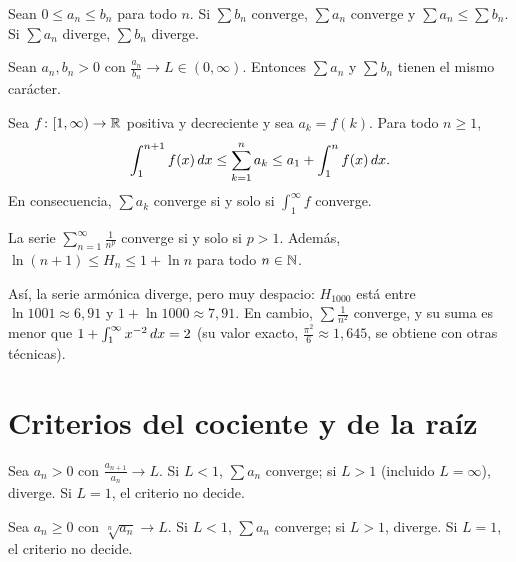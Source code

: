 \begin{teorema}\label{teo:comparacion-series}
Sean $0\le a_n\le b_n$ para todo $n$. Si $\sum b_n$ converge, $\sum a_n$ converge y $\sum a_n\le\sum b_n$. Si $\sum a_n$ diverge, $\sum b_n$ diverge.
\end{teorema}

\begin{teorema}\label{teo:comparacion-limite-series}
Sean $a_n,b_n>0$ con $\frac{a_n}{b_n}\to L\in(0,\infty)$. Entonces $\sum a_n$ y $\sum b_n$ tienen el mismo carácter.
\end{teorema}

\begin{teorema}\label{teo:criterio-integral}
Sea $f\colon[1,\infty)\to\mathbb{R}$ positiva y decreciente y sea $a_k=f(k)$. Para todo $n\ge1$,
\[
\int_1^{n+1}f(x)\mathop{}\!d x\le\sum_{k=1}^{n}a_k\le a_1+\int_1^{n}f(x)\mathop{}\!d x .
\]
En consecuencia, $\sum a_k$ converge si y solo si $\int_1^{\infty}f$ converge.
\end{teorema}

\addtocounter{figure}{1}%

\begin{corolario}[Series $p$]\label{cor:series-p}
La serie $\sum_{n=1}^{\infty}\frac{1}{n^{p}}$ converge si y solo si $p>1$. Además, $\ln(n+1)\le H_n\le1+\ln n$ para todo $n\in\mathbb{N}$.
\end{corolario}

Así, la serie armónica diverge, pero muy despacio: $H_{1000}$ está entre $\ln1001\approx6{,}91$ y $1+\ln1000\approx7{,}91$. En cambio, $\sum\frac{1}{n^{2}}$ converge, y su suma es menor que $1+\int_1^\infty x^{-2}\mathop{}\!d x=2$ (su valor exacto, $\frac{\pi^{2}}{6}\approx1{,}645$, se obtiene con otras técnicas).

\section{Criterios del cociente y de la raíz}

\begin{teorema}\label{teo:cociente}
Sea $a_n>0$ con $\frac{a_{n+1}}{a_n}\to L$. Si $L<1$, $\sum a_n$ converge; si $L>1$ (incluido $L=\infty$), diverge. Si $L=1$, el criterio no decide.
\end{teorema}

\begin{teorema}\label{teo:raiz}
Sea $a_n\ge0$ con $\sqrt[n]{a_n}\to L$. Si $L<1$, $\sum a_n$ converge; si $L>1$, diverge. Si $L=1$, el criterio no decide.
\end{teorema}

